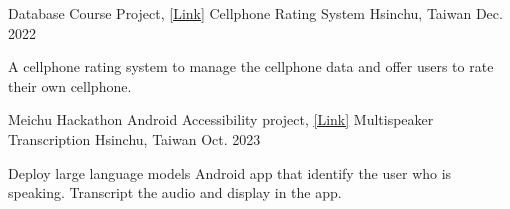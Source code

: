 \begin{cventries}
  \cventry
    {Database Course Project, \href{https://github.com/KJLdefeated/Database-Final-project}{\underline{[Link]}}} 
    {Cellphone Rating System} 
    {Hsinchu, Taiwan} 
    {Dec. 2022} 
    {
      \begin{cvitems} %
        \item {A cellphone rating system to manage the cellphone data and offer users to rate their own cellphone.}
      \end{cvitems}
    }



\cventry
    {Meichu Hackathon Android Accessibility project, \href{https://github.com/stanleyshen2003/multispeaker_transcription}{\underline{[Link]}}} 
    {Multispeaker Transcription} 
    {Hsinchu, Taiwan} 
    {Oct. 2023}
    {
      \begin{cvitems} %
        \item {Deploy large language models Android app that identify the user who is speaking. Transcript the audio and display in the app.}
      \end{cvitems}
    }

\end{cventries}
